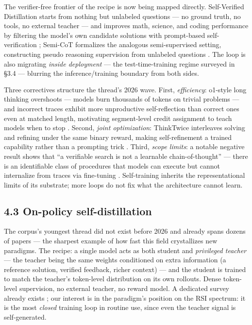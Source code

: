 \documentclass[
  11pt,
]{article}
\begin{document}
The verifier-free frontier of the recipe is now being mapped directly.
Self-Verified Distillation starts from nothing but unlabeled questions
--- no ground truth, no tools, no external teacher --- and improves
math, science, and coding performance by filtering the model's own
candidate solutions with prompt-based self-verification
\citep{lee2026selfa}; Semi-CoT formalizes the analogous semi-supervised
setting, constructing pseudo reasoning supervision from unlabeled
questions \citep{he2026revisiting}. The loop is also migrating
\emph{inside deployment} --- the test-time-training regime surveyed in
§3.4 --- blurring the inference/training boundary from both sides.

Three correctives structure the thread's 2026 wave. First,
\emph{efficiency}: o1-style long thinking overshoots --- models burn
thousands of tokens on trivial problems \citep{chen2024not} --- and
incorrect traces exhibit more unproductive self-reflection than correct
ones even at matched length, motivating segment-level credit assignment
to teach models when to stop \citep{lee2026know}. Second, \emph{joint
optimization}: ThinkTwice interleaves solving and refining under the
same binary reward, making self-refinement a trained capability rather
than a prompting trick \citep{jiao2026thinktwice}. Third, \emph{scope
limits}: a notable negative result shows that ``a verifiable search is
not a learnable chain-of-thought'' --- there is an identifiable class of
procedures that models can execute but cannot internalize from traces
via fine-tuning \citep{patel2026verifiable}. Self-training inherits the
representational limits of its substrate; more loops do not fix what the
architecture cannot learn.

\subsection{4.3 On-policy
self-distillation}\label{on-policy-self-distillation}

The corpus's youngest thread did not exist before 2026 and already spans
dozens of papers --- the sharpest example of how fast this field
crystallizes new paradigms. The recipe: a single model acts as both
student and \emph{privileged teacher} --- the teacher being the same
weights conditioned on extra information (a reference solution, verified
feedback, richer context) --- and the student is trained to match the
teacher's token-level distribution on its own rollouts. Dense
token-level supervision, no external teacher, no reward model. A
dedicated survey already exists \citep{song2026survey}; our interest is
in the paradigm's position on the RSI spectrum: it is the most
\emph{closed} training loop in routine use, since even the teacher
signal is self-generated.
\end{document}
